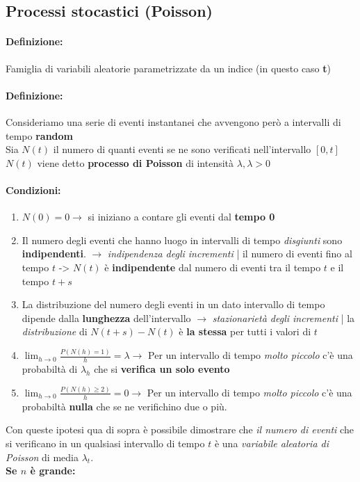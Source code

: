 \documentclass[]{article}
\newcommand{\definizione}{\paragraph{Definizione:}}
\begin{document}
    \subsection{Processi stocastici (Poisson)}
    \definizione Famiglia di variabili aleatorie parametrizzate da un indice (in questo caso \textbf{t})
    \definizione Consideriamo una serie di eventi instantanei che avvengono però a intervalli di tempo \textbf{random} \\
    Sia $N(t)$ il numero di quanti eventi se ne sono verificati nell'intervallo $[0, t]$ \\
    $N(t)$ viene detto \textbf{processo di Poisson} di intensità $\lambda, \lambda > 0$
    \paragraph{Condizioni:}
    \begin{enumerate}
        \item $N(0) = 0 \longrightarrow$ si iniziano a contare gli eventi dal \textbf{tempo 0}
        \item Il numero degli eventi che hanno luogo in intervalli di tempo \textit{disgiunti} sono \textbf{indipendenti}. $\rightarrow$ \textit{indipendenza degli incrementi} | 
        il numero di eventi fino al tempo $t$ -> $N(t)$ è \textbf{indipendente} dal numero di eventi tra il tempo $t$ e il tempo $t+s$
        \item La distribuzione del numero degli eventi in un dato intervallo di tempo dipende dalla \textbf{lunghezza} dell'intervallo $\rightarrow$ \textit{stazionarietà degli incrementi} | la \textit{distribuzione} di $N(t+s) - N(t)$ è \textbf{la stessa} per tutti i valori di $t$
        \item $\displaystyle \lim_{h \to 0} \frac{P(N(h) = 1)}{h} = \lambda \rightarrow$ Per un intervallo di tempo \textit{molto piccolo} c'è una probabiltà di $\lambda_h$ che si \textbf{verifica un solo evento}
        \item $\displaystyle \lim_{h \to 0} \frac{P(N(h) \geq 2)}{h} = 0 \rightarrow$ Per un intervallo di tempo \textit{molto piccolo} c'è una probabiltà \textbf{nulla} che se ne verifichino due o più.
    \end{enumerate}
    Con queste ipotesi qua di sopra è possibile dimostrare che \textit{il numero di eventi} che si verificano in un qualsiasi intervallo di tempo $t$ è una \textit{variabile aleatoria di Poisson} di media $\lambda_t$. \\
    \textbf{Se $n$ è grande:}
\end{document}
